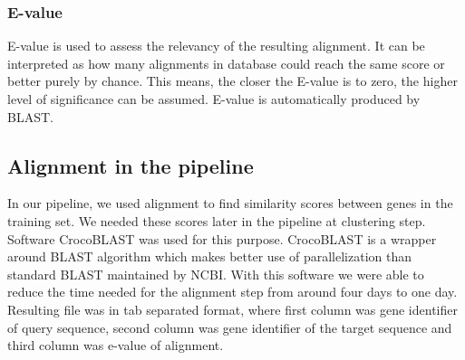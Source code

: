 \subsubsection{E-value}
E-value is used to assess the relevancy of the resulting alignment.
It can be interpreted as how many alignments in database could reach the same score or better purely by chance.
This means, the closer the E-value is to zero, the higher level of significance can be assumed.
E-value is automatically produced by BLAST.

\subsection{Alignment in the pipeline}
In our pipeline, we used alignment to find similarity scores between genes in the training set.
We needed these scores later in the pipeline at clustering step.
Software CrocoBLAST was used for this purpose.
CrocoBLAST is a wrapper around BLAST algorithm which makes better use of parallelization than standard BLAST maintained by NCBI.
With this software we were able to reduce the time needed for the alignment step from around four days to one day.
Resulting file was in tab separated format, where first column was gene identifier of query sequence, second column was gene identifier of the target sequence and third column was e-value of alignment.
